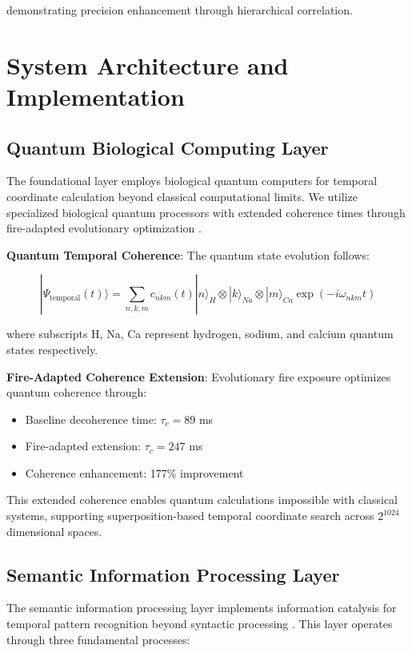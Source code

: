 \documentclass[11pt]{article}
\theoremstyle{remark}
\begin{document}
demonstrating precision enhancement through hierarchical correlation.

\section{System Architecture and Implementation}

\subsection{Quantum Biological Computing Layer}

The foundational layer employs biological quantum computers for temporal coordinate calculation beyond classical computational limits. We utilize specialized biological quantum processors with extended coherence times through fire-adapted evolutionary optimization \cite{sachikonye2024biological}.

\textbf{Quantum Temporal Coherence}: The quantum state evolution follows:

$$|\Psi_{\text{temporal}}(t)\rangle = \sum_{n,k,m} c_{nkm}(t) |n\rangle_H \otimes |k\rangle_{Na} \otimes |m\rangle_{Ca} \exp(-i\omega_{nkm} t)$$

where subscripts H, Na, Ca represent hydrogen, sodium, and calcium quantum states respectively.

\textbf{Fire-Adapted Coherence Extension}: Evolutionary fire exposure optimizes quantum coherence through:
\begin{itemize}
\item Baseline decoherence time: $\tau_c = 89$ ms
\item Fire-adapted extension: $\tau_c = 247$ ms
\item Coherence enhancement: 177\% improvement
\end{itemize}

This extended coherence enables quantum calculations impossible with classical systems, supporting superposition-based temporal coordinate search across $2^{1024}$ dimensional spaces.

\subsection{Semantic Information Processing Layer}

The semantic information processing layer implements information catalysis for temporal pattern recognition beyond syntactic processing \cite{sachikonye2024semantic}. This layer operates through three fundamental processes:
\end{document}
